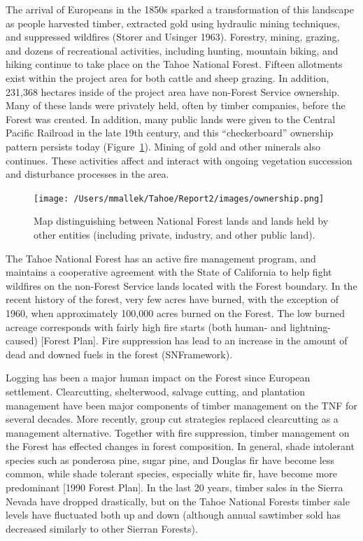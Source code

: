 The arrival of Europeans in the 1850s sparked a transformation of this landscape as people harvested timber, extracted gold using hydraulic mining techniques, and suppressed wildfires (Storer and Usinger 1963). Forestry, mining, grazing, and dozens of recreational activities, including hunting, mountain biking, and hiking continue to take place on the Tahoe National Forest. Fifteen allotments exist within the project area for both cattle and sheep grazing. In addition, 231,368 hectares inside of the project area have non-Forest Service ownership. Many of these lands were privately held, often by timber companies, before the Forest was created. In addition, many public lands were given to the Central Pacific Railroad in the late 19th century, and this ``checkerboard'' ownership pattern persists today (Figure~\ref{ownership}). Mining of gold and other minerals also continues. These activities affect and interact with ongoing vegetation succession and disturbance processes in the area. 

\begin{figure}[!htbp]
\centering
\texttt{[image: /Users/mmallek/Tahoe/Report2/images/ownership.png]}
\caption{Map distinguishing between National Forest lands and lands held by other entities (including private, industry, and other public land).} 
\label{ownership}
\end{figure}

The Tahoe National Forest has an active fire management program, and maintains a cooperative agreement with the State of California to help fight wildfires on the non-Forest Service lands located with the Forest boundary. In the recent history of the forest, very few acres have burned, with the exception of 1960, when approximately 100,000 acres burned on the Forest. The low burned acreage corresponds with fairly high fire starts (both human- and lightning-caused) [Forest Plan]. Fire suppression has lead to an increase in the amount of dead and downed fuels in the forest (SNFramework).

Logging has been a major human impact on the Forest since European settlement. Clearcutting, shelterwood, salvage cutting, and plantation management have been major components of timber management on the TNF for several decades. More recently, group cut strategies replaced clearcutting as a management alternative. Together with fire suppression, timber management on the Forest has effected changes in forest composition. In general, shade intolerant species such as ponderosa pine, sugar pine, and Douglas fir have become less common, while shade tolerant species, especially white fir, have become more predominant [1990 Forest Plan]. In the last 20 years, timber sales in the Sierra Nevada have dropped drastically, but on the Tahoe National Forests timber sale levels have fluctuated both up and down (although annual sawtimber sold has decreased similarly to other Sierran Forests).


